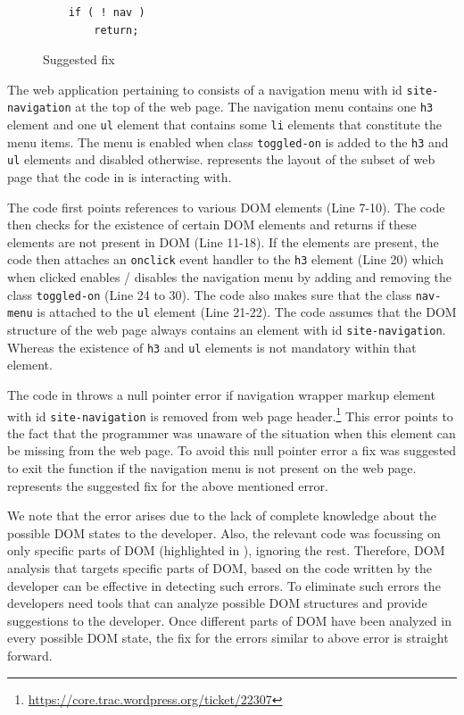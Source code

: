 	\begin{figure}
	\medskip
	\begin{lstlisting}
	if ( ! nav )
		return;
	\end{lstlisting}
	\caption{Suggested fix}
	\label{Fig:Fix}
	\end{figure}
	
	The web application pertaining to  consists of a navigation menu with id \texttt{site-navigation} at the top of the web page. The navigation menu contains one \texttt{h3} element and one \texttt{ul} element that contains some \texttt{li} elements that constitute the menu items. The menu is enabled when class \texttt{toggled-on} is added to the \texttt{h3} and \texttt{ul} elements and disabled otherwise.  represents the layout of the subset of web page that the \javascript code in  is interacting with.
	
	The \javascript code first points references to various DOM elements (Line 7-10). The code then checks for the existence of certain DOM elements and returns if these elements are not present in DOM (Line 11-18). If the elements are present, the code then attaches an \texttt{onclick} event handler to the \texttt{h3} element (Line 20) which when clicked enables / disables the navigation menu by adding and removing the class \texttt{toggled-on} (Line 24 to 30). The code also makes sure that the class \texttt{nav-menu} is attached to the \texttt{ul} element (Line 21-22). The \javascript code assumes that the DOM structure of the web page always contains an element with id \texttt{site-navigation}. Whereas the existence of \texttt{h3} and \texttt{ul} elements is not mandatory within that element.
		
	The \javascript code in  throws a null pointer error if navigation wrapper markup \ie element with id \texttt{site-navigation} is removed from web page header.\footnote{\url{https://core.trac.wordpress.org/ticket/22307}} This error points to the fact that the programmer was unaware of the situation when this element can be missing from the web page. To avoid this null pointer error a fix was suggested to exit the function if the navigation menu is not present on the web page.  represents the suggested fix for the above mentioned error.
	
	We note that the error arises due to the lack of complete knowledge about the possible DOM states to the developer. Also, the relevant \javascript code was focussing on only specific parts of DOM (highlighted in ), ignoring the rest. Therefore, DOM analysis that targets specific parts of DOM, based on the \javascript code written by the developer can be effective in detecting such errors. To eliminate such errors the developers need tools that can analyze possible DOM structures and provide suggestions to the developer. Once different parts of DOM have been analyzed in every possible DOM state, the fix for the errors similar to above error is straight forward.
	
